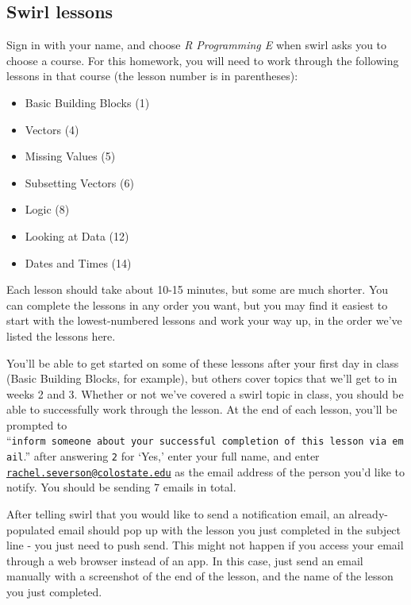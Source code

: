 \documentclass[]{book}
\makeatletter
\providecommand{\tightlist}{%
  \setlength{\itemsep}{0pt}\setlength{\parskip}{0pt}}
\newenvironment{kframe}{%
\medskip{}
\setlength{\fboxsep}{.8em}
 \def\at@end@of@kframe{}%
 \ifinner\ifhmode%
  \def\at@end@of@kframe{\end{minipage}}%
  \begin{minipage}{\columnwidth}%
 \fi\fi%
 \def\FrameCommand##1{\hskip\@totalleftmargin \hskip-\fboxsep
 \colorbox{shadecolor}{##1}\hskip-\fboxsep
     \hskip-\linewidth \hskip-\@totalleftmargin \hskip\columnwidth}%
 \MakeFramed {\advance\hsize-\width
   \@totalleftmargin\z@ \linewidth\hsize
   \@setminipage}}%
 {\par\unskip\endMakeFramed%
 \at@end@of@kframe}
\newenvironment{rmdblock}[1]
  {
  \begin{itemize}
  \renewcommand{\labelitemi}{
    \raisebox{-.7\height}[0pt][0pt]{
      {\setkeys{Gin}{width=3em,keepaspectratio}\texttt{[image: images/\#1]}}
    }
  }
  \setlength{\fboxsep}{1em}
  \begin{kframe}
  \item
  }
  {
  \end{kframe}
  \end{itemize}
  }
\newenvironment{rmdnote}
  {\begin{rmdblock}{note}}
  {\end{rmdblock}}
\makeatother
\begin{document}
\subsection{Swirl lessons}\label{swirl-lessons}

Sign in with your name, and choose \emph{R Programming E} when swirl
asks you to choose a course. For this homework, you will need to work
through the following lessons in that course (the lesson number is in
parentheses):

\begin{itemize}
\tightlist
\item
  Basic Building Blocks (1)
\item
  Vectors (4)
\item
  Missing Values (5)
\item
  Subsetting Vectors (6)
\item
  Logic (8)
\item
  Looking at Data (12)
\item
  Dates and Times (14)
\end{itemize}

Each lesson should take about 10-15 minutes, but some are much shorter.
You can complete the lessons in any order you want, but you may find it
easiest to start with the lowest-numbered lessons and work your way up,
in the order we've listed the lessons here.

You'll be able to get started on some of these lessons after your first
day in class (Basic Building Blocks, for example), but others cover
topics that we'll get to in weeks 2 and 3. Whether or not we've covered
a swirl topic in class, you should be able to successfully work through
the lesson. At the end of each lesson, you'll be prompted to
``\texttt{inform\ someone\ about\ your\ successful\ completion\ of\ this\ lesson\ via\ email}.''
after answering \texttt{2} for `Yes,' enter your full name, and enter
\href{mailto:rachel.severson@colostate.edu}{\nolinkurl{rachel.severson@colostate.edu}}
as the email address of the person you'd like to notify. You should be
sending 7 emails in total.

\begin{rmdnote}
After telling swirl that you would like to send a notification email, an
already-populated email should pop up with the lesson you just completed
in the subject line - you just need to push send. This might not happen
if you access your email through a web browser instead of an app. In
this case, just send an email manually with a screenshot of the end of
the lesson, and the name of the lesson you just completed.
\end{rmdnote}
\end{document}
